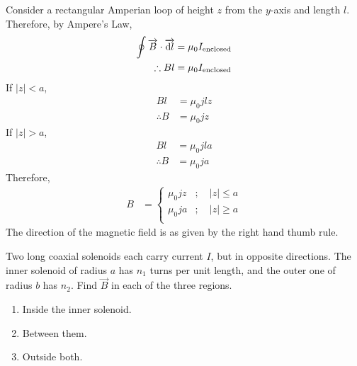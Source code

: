 \documentclass[fleqn, a4paper, 11pt, oneside]{amsart}
\theoremstyle{definition}
\theoremstyle{theorem}
\begin{document}
\begin{solution}
	Consider a rectangular Amperian loop of height $z$ from the $y$-axis and length $l$.\\
	Therefore, by Ampere's Law,
	\begin{align*}
		\oint \overrightarrow{B} \cdot \overrightarrow{\dif l} & = \mu_0 I_{\textnormal{enclosed}} \\
		\therefore B l                                         & = \mu_0 I_{\textnormal{enclosed}}
	\end{align*}
	If $|z| < a$,
	\begin{align*}
		B l          & = \mu_0 j l z \\
		\therefore B & = \mu_0 j z
	\end{align*}
	If $|z| > a$,
	\begin{align*}
		B l          & = \mu_0 j l a \\
		\therefore B & = \mu_0 j a
	\end{align*}
	Therefore,
	\begin{align*}
		B &=
			\begin{cases}
				\mu_0 j z & ;\quad |z| \le a \\
				\mu_0 j a & ;\quad |z| \ge a \\
			\end{cases}
	\end{align*}
	The direction of the magnetic field is as given by the right hand thumb rule.
\end{solution}

\begin{question}
	Two long coaxial solenoids each carry current $I$, but in opposite directions.
	The inner solenoid of radius $a$ has $n_1$ turns per unit length, and the outer one of radius $b$ has $n_2$.
	Find $\overrightarrow{B}$ in each of the three regions.
	\begin{enumerate}
		\item Inside the inner solenoid.
		\item Between them.
		\item Outside both.
	\end{enumerate}
\end{question}
\end{document}

